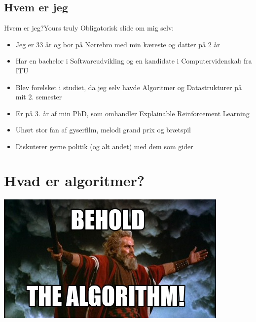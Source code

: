 \documentclass{beamer}
\begin{document}
\subsection[Mig]{Hvem er jeg}

\begin{frame}{Hvem er jeg?}{Yours truly}
    Obligatorisk slide om mig selv:

    \begin{itemize}[<+->]
        \item Jeg er 33 år og bor på Nørrebro med min kæreste og datter på 2 år
        \item Har en bachelor i Softwareudvikling og en kandidate i
            Computervidenskab fra ITU
        \item Blev forelsket i studiet, da jeg selv havde Algoritmer og
            Datastrukturer på mit 2. semester
        \item Er på 3. år af min PhD, som omhandler Explainable Reinforcement
            Learning
        \item Uhørt stor fan af gyserfilm, melodi grand prix og brætspil
        \item Diskuterer gerne politik (og alt andet) med dem som gider
    \end{itemize}
\end{frame}



\section{Hvad er algoritmer?}%

\begin{frame}{}{}
    \includegraphics[width=\textwidth]{behold-the-algorithm}
\end{frame}
\end{document}

